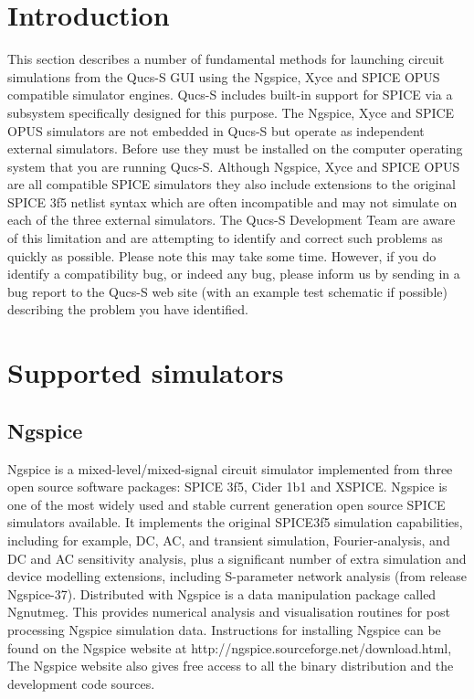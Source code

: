 \documentclass[10pt, a4paper]{report}
\begin{document}
\section{Introduction}
This section describes a number of fundamental methods for launching circuit simulations from the Qucs-S GUI  using
the Ngspice, Xyce and SPICE OPUS compatible simulator engines. Qucs-S includes built-in support for SPICE via a  subsystem specifically designed for this purpose. The Ngspice, Xyce and SPICE OPUS simulators are not embedded in Qucs-S but operate as independent external simulators. Before use they must be installed on the computer operating system that you are running Qucs-S. Although Ngspice, Xyce and SPICE OPUS are all compatible SPICE simulators they also include extensions to the original SPICE 3f5 netlist syntax which are often incompatible and may not simulate on each of the three external simulators.  The Qucs-S Development Team are aware of this limitation and are attempting  to identify and correct such problems as quickly as possible.  Please note this may take some time.  However, if you do identify a compatibility bug, or indeed any bug, please inform us by sending in a bug report to the Qucs-S web site (with an example test schematic if possible) describing the problem you have identified.   
\section{Supported simulators}
\subsection{Ngspice}
Ngspice is a mixed-level/mixed-signal circuit simulator implemented from three open source software packages: SPICE 3f5, Cider 1b1 and XSPICE. Ngspice is one of the most widely used and stable current generation open source SPICE simulators available.  It implements the original SPICE3f5 simulation capabilities, including for example, DC, AC, and transient simulation, Fourier-analysis, and DC and AC sensitivity analysis,
plus a significant number of extra simulation and device modelling extensions, including S-parameter network analysis (from release Ngspice-37).  Distributed with Ngspice is a data manipulation package called Ngnutmeg.  This provides numerical analysis and visualisation routines for post processing Ngspice simulation data. Instructions for installing Ngspice can be found on the Ngspice website at http://ngspice.sourceforge.net/download.html,  The Ngspice website also gives free access to all the binary distribution and the development code sources.
\end{document}
